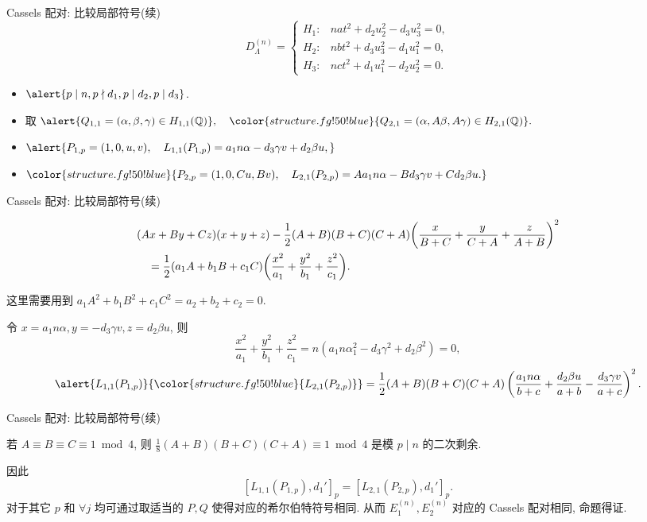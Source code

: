 \documentclass[aspectratio=169,handout]{ctexbeamer}
\renewcommand\emph[1]{{\color{structure.fg!50!blue}{#1}}}
\begin{document}
\begin{frame}{Cassels 配对: 比较局部符号(续)}
\[D_{\Lambda}^{(n)}=
\begin{cases}
	H_1:& nat^2+d_2u_2^2-d_3u_3^2=0,\\
	H_2:& nbt^2+d_3u_3^2-d_1u_1^2=0,\\
	H_3:& nct^2+d_1u_1^2-d_2u_2^2=0.
\end{cases}\]
\onslide<+->
\begin{itemize}
\item $\alert{p\mid n,p\nmid d_1,p\mid d_2,p\mid d_3}$.
\item 取 $\alert{Q_{1,1}=(\alpha,\beta,\gamma)\in H_{1,1}(\BQ)},\quad
\emph{Q_{2,1}=(\alpha,A\beta,A\gamma)\in H_{2,1}(\BQ)}.$
\item $\alert{P_{1,p}=(1,0,u,v),\quad
L_{1,1}(P_{1,p})=a_1n\alpha-d_3\gamma v+d_2\beta u,}$
\item $\emph{P_{2,p}=(1,0,Cu,Bv),\quad
L_{2,1}(P_{2,p})=Aa_1n\alpha-Bd_3\gamma v+Cd_2\beta u.}$
\end{itemize}
\end{frame}



\begin{frame}{Cassels 配对: 比较局部符号(续)}
\begin{lemma}
	\[\begin{split}
	&(Ax+By+Cz)(x+y+z)-\frac{1}{2}(A+B)(B+C)(C+A)\biggl(
	\frac x{B+C}+
	\frac y{C+A}+
	\frac z{A+B}\biggr)^2\\
	&\quad=\frac{1}{2}(a_1A+b_1B+c_1C)\biggl(\frac{x^2}{a_1}+\frac{y^2}{b_1}+\frac{z^2}{c_1}\biggr).
	\end{split}\]
\end{lemma}
\onslide<+->
这里需要用到 $a_1A^2+b_1B^2+c_1C^2=a_2+b_2+c_2=0$.

\onslide<+->
令 $x=a_1n\alpha,y=-d_3\gamma v, z=d_2\beta u$, 则
\[\frac{x^2}{a_1}+\frac{y^2}{b_1}+\frac{z^2}{c_1}=n(a_1n\alpha_1^2-d_3\gamma^2+d_2\beta^2)=0,\]
\onslide<+->
\[\alert{L_{1,1}(P_{1,p})}\emph{L_{2,1}(P_{2,p})}=\frac12{(A+B)(B+C)(C+A)}\left(\frac{a_1n\alpha}{b+c}+\frac{d_2\beta u}{a+b}-\frac{d_3\gamma v}{a+c}\right)^2.\]
\end{frame}


\begin{frame}{Cassels 配对: 比较局部符号(续)}
\onslide<+->
\begin{lemma}
若 $A\equiv B\equiv C\equiv 1\bmod 4$, 则 $\frac18(A+B)(B+C)(C+A)\equiv 1\bmod 4$ 是模 $p\mid n$ 的二次剩余.
\end{lemma}
\onslide<+->
因此
\[[L_{1,1}(P_{1,p}),d_1']_p=[L_{2,1}(P_{2,p}),d_1']_p.\]
\onslide<+->
对于其它 $p$ 和 $\forall j$ 均可通过取适当的 $P,Q$ 使得对应的希尔伯特符号相同.
\onslide<+->
从而 $E_1^{(n)},E_2^{(n)}$ 对应的 Cassels 配对相同, 命题得证.
\end{frame}
\end{document}
